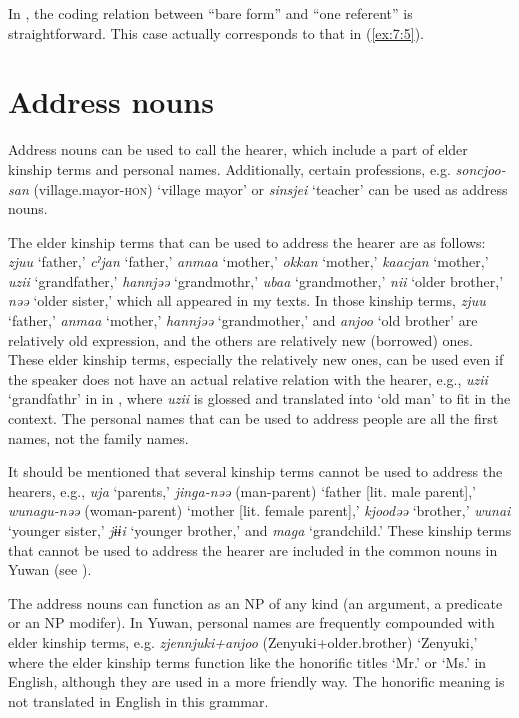 In , the coding relation between “bare form” and “one referent” is straightforward. This case actually corresponds to that in (\ref{ex:7:5}).


\section{Address nouns}

Address nouns can be used to call the hearer, which include a part of elder kinship terms and personal names. Additionally, certain professions, e.g. \textit{soncjoo-san} (village.mayor-\textsc{hon}) ‘village mayor’ or \textit{sinsjei} ‘teacher’ can be used as address nouns.

The elder kinship terms that can be used to address the hearer are as follows: \textit{zjuu} ‘father,’ \textit{cˀjan} ‘father,’ \textit{anmaa} ‘mother,’ \textit{okkan} ‘mother,’ \textit{kaacjan} ‘mother,’ \textit{uzii} ‘grandfather,’ \textit{hannjəə} ‘grandmothr,’ \textit{ubaa} ‘grandmother,’ \textit{nii} ‘older brother,’ \textit{nəə} ‘older sister,’ which all appeared in my texts. In those kinship terms, \textit{zjuu} ‘father,’ \textit{anmaa} ‘mother,’ \textit{hannjəə} ‘grandmother,’ and \textit{anjoo} ‘old brother’ are relatively old expression, and the others are relatively new (borrowed) ones. These elder kinship terms, especially the relatively new ones, can be used even if the speaker does not have an actual relative relation with the hearer, e.g., \textit{uzii} ‘grandfathr’ in  in , where \textit{uzii} is glossed and translated into ‘old man’ to fit in the context. The personal names that can be used to address people are all the first names, not the family names.

It should be mentioned that several kinship terms cannot be used to address the hearers, e.g., \textit{uja} ‘parents,’ \textit{jinga-nəə} (man-parent) ‘father [lit. male parent],’ \textit{wunagu-nəə} (woman-parent) ‘mother [lit. female parent],’ \textit{kjoodəə} ‘brother,’ \textit{wunai} ‘younger sister,’ \textit{jɨɨi} ‘younger brother,’ and \textit{maga} ‘grandchild.’ These kinship terms that cannot be used to address the hearer are included in the common nouns in Yuwan (see ).

The address nouns can function as an NP of any kind (an argument, a predicate or an NP modifer). In Yuwan, personal names are frequently compounded with elder kinship terms, e.g. \textit{zjennjuki+anjoo} (Zenyuki+older.brother) ‘Zenyuki,’ where the elder kinship terms function like the honorific titles ‘Mr.’ or ‘Ms.’ in English, although they are used in a more friendly way. The honorific meaning is not translated in English in this grammar.

